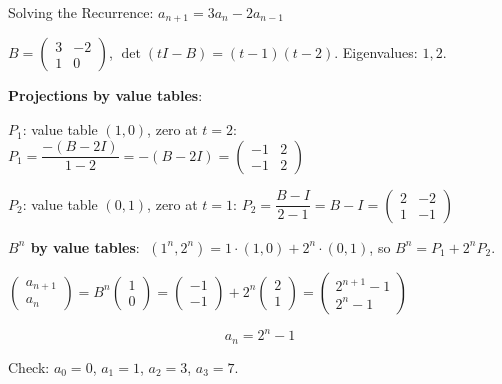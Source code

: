 \documentclass[10pt]{beamer}
\theoremstyle{definition}
\newcommand{\x}[1]{\alert{\textbf{#1}}}
\begin{document}
%
\begin{frame}[shrink=5]{Solving the Recurrence: $a_{n+1} = 3a_n - 2a_{n-1}$}

$B = \begin{pmatrix}3&-2\\1&0\end{pmatrix}$, \quad $\det(tI - B) = (t-1)(t-2)$. \quad Eigenvalues: $1, 2$.

\vfill

\x{Projections by value tables}:

$P_1$: value table $(1,0)$, zero at $t=2$: \;
$P_1 = \dfrac{-(B-2I)}{1-2} = -(B-2I) = \begin{pmatrix}-1&2\\-1&2\end{pmatrix}$

\medskip

$P_2$: value table $(0,1)$, zero at $t=1$: \;
$P_2 = \dfrac{B-I}{2-1} = B-I = \begin{pmatrix}2&-2\\1&-1\end{pmatrix}$

\vfill

\x{$B^n$ by value tables}: $\;(1^n, 2^n) = 1\!\cdot\!(1,0) + 2^n\!\cdot\!(0,1)$, so $B^n = P_1 + 2^n P_2$.

\vfill

$\begin{pmatrix}a_{n+1}\\a_n\end{pmatrix} = B^n\begin{pmatrix}1\\0\end{pmatrix} = \begin{pmatrix}-1\\-1\end{pmatrix} + 2^n\begin{pmatrix}2\\1\end{pmatrix} = \begin{pmatrix}2^{n+1}-1\\2^n-1\end{pmatrix}$

\vfill

$$\boxed{a_n = 2^n - 1}$$

Check: $a_0 = 0$, $a_1 = 1$, $a_2 = 3$, $a_3 = 7$. \;\checkmark

\end{frame}
\end{document}
